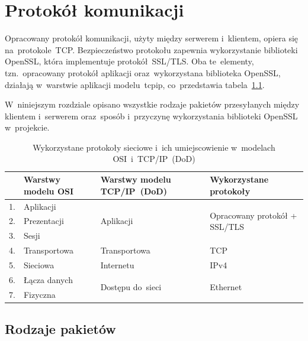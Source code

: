 \documentclass[thesis]{subfiles}
\begin{document}
\chapter{Protokół komunikacji}
\label{chapter:protokol}

Opracowany protokół komunikacji, użyty między serwerem i~klientem, opiera się na~protokole~TCP. Bezpieczeństwo protokołu zapewnia wykorzystanie biblioteki OpenSSL, która implementuje protokół~SSL/TLS. Oba te~elementy, tzn.~opracowany protokół aplikacji oraz~wykorzystana biblioteka OpenSSL, działają w~warstwie aplikacji modelu~\gls{tcpip}, co~przedstawia tabela~\ref{fig:protocol-big-view}.

W~niniejszym rozdziale opisano wszystkie rodzaje pakietów przesyłanych między klientem i~serwerem oraz~sposób i~przyczynę wykorzystania biblioteki OpenSSL w~projekcie.

\begin{table}
\centering
\renewcommand{\arraystretch}{1.3}
\begin{tabular}{l|l|l|l}
	   & Warstwy modelu OSI & Warstwy modelu TCP/IP~(DoD)       & Wykorzystane protokoły \\\hline\hline
	1. & Aplikacji          & \multirow{3}{*}{Aplikacji}        & \multirow{3}{*}{\parbox{3.5cm}{Opracowany \mbox{protokół} + SSL/TLS}} \\\cline{1-2}
	2. & Prezentacji        &                                   & \\\cline{1-2}
	3. & Sesji              &                                   & \\\hline
	4. & Transportowa       & Transportowa                      & TCP \\\hline
	5. & Sieciowa           & Internetu                         & IPv4 \\\hline
	6. & Łącza danych       & \multirow{2}{*}{Dostępu do~sieci} & \multirow{2}{*}{Ethernet} \\\cline{1-2}
	7. & Fizyczna           &                                   &
\end{tabular}
\caption{Wykorzystane protokoły sieciowe i~ich umiejscowienie w~modelach OSI~i~TCP/IP~(DoD)}
\label{fig:protocol-big-view}
\end{table}


\section{Rodzaje pakietów}
\end{document}
